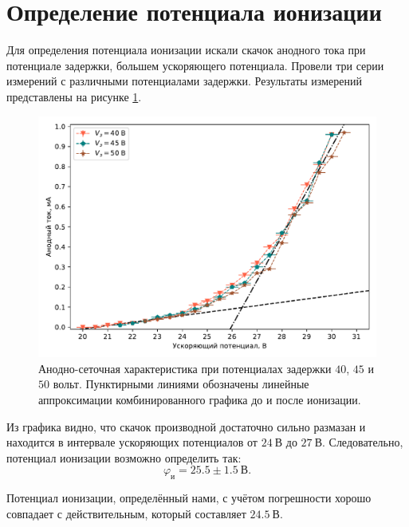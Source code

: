 \documentclass[12pt]{article}
\begin{document}
	\section{Определение потенциала ионизации}
	Для определения потенциала ионизации искали скачок анодного тока при потенциале задержки, большем ускоряющего потенциала. Провели три серии измерений с различными потенциалами задержки. Результаты измерений представлены на рисунке \ref{fig:figure2}.
	\begin{figure}[htbp]
		\centering
		\includegraphics[width=\linewidth]{../plots/2}
		\caption{Анодно-сеточная характеристика при потенциалах задержки $40$, $45$ и $50$ вольт. Пунктирными линиями обозначены линейные аппроксимации комбинированного графика до и после ионизации.}
		\label{fig:figure2}
	\end{figure}
	Из графика видно, что скачок производной достаточно сильно размазан и находится в интервале ускоряющих потенциалов от $24\ \text{В}$ до $27\ \text{В}$. Следовательно, потенциал ионизации возможно определить так:
	\begin{equation}
		\varphi_\text{и} = 25.5\pm1.5\ \text{В}.
	\end{equation}
	\par Потенциал ионизации, определённый нами, с учётом погрешности хорошо совпадает с действительным, который составляет $24.5\ \text{В}$.
\end{document}
